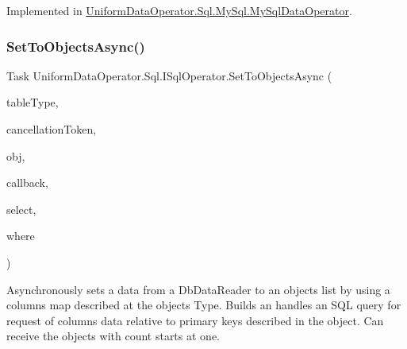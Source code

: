 Implemented in \mbox{\hyperlink{class_uniform_data_operator_1_1_sql_1_1_my_sql_1_1_my_sql_data_operator_a4079de461f0a37c0b69754a0e93dc05b}{Uniform\+Data\+Operator.\+Sql.\+My\+Sql.\+My\+Sql\+Data\+Operator}}.

\mbox{\label{interface_uniform_data_operator_1_1_sql_1_1_i_sql_operator_a396bf6c6d962ba910367755ad13d3d3c}} 
\subsubsection{\texorpdfstring{Set\+To\+Objects\+Async()}{SetToObjectsAsync()}\hspace{0.1cm}{\footnotesize\ttfamily [1/3]}}
{\footnotesize\ttfamily Task Uniform\+Data\+Operator.\+Sql.\+I\+Sql\+Operator.\+Set\+To\+Objects\+Async (\begin{DoxyParamCaption}\item[{Type}]{table\+Type,  }\item[{Cancellation\+Token}]{cancellation\+Token,  }\item[{object}]{obj,  }\item[{Action$<$ I\+List $>$}]{callback,  }\item[{string \mbox{[}$\,$\mbox{]}}]{select,  }\item[{params string \mbox{[}$\,$\mbox{]}}]{where }\end{DoxyParamCaption})}



Asynchronously sets a data from a Db\+Data\+Reader to an objects list by using a columns map described at the object\textquotesingle{}s Type. Builds an handles an S\+QL query for request of columns data relative to primary keys described in the object. Can receive the objects with count starts at one. 


